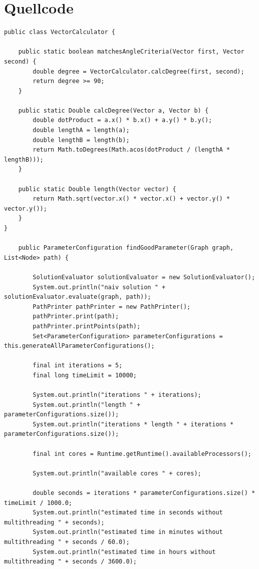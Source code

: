 \section{Quellcode}\label{sec:quellcode}
\begin{lstlisting}[label={lst:source}]
public class VectorCalculator {

    public static boolean matchesAngleCriteria(Vector first, Vector second) {
        double degree = VectorCalculator.calcDegree(first, second);
        return degree >= 90;
    }

    public static Double calcDegree(Vector a, Vector b) {
        double dotProduct = a.x() * b.x() + a.y() * b.y();
        double lengthA = length(a);
        double lengthB = length(b);
        return Math.toDegrees(Math.acos(dotProduct / (lengthA * lengthB)));
    }

    public static Double length(Vector vector) {
        return Math.sqrt(vector.x() * vector.x() + vector.y() * vector.y());
    }
}

    public ParameterConfiguration findGoodParameter(Graph graph, List<Node> path) {

        SolutionEvaluator solutionEvaluator = new SolutionEvaluator();
        System.out.println("naiv solution " + solutionEvaluator.evaluate(graph, path));
        PathPrinter pathPrinter = new PathPrinter();
        pathPrinter.print(path);
        pathPrinter.printPoints(path);
        Set<ParameterConfiguration> parameterConfigurations = this.generateAllParameterConfigurations();

        final int iterations = 5;
        final long timeLimit = 10000;

        System.out.println("iterations " + iterations);
        System.out.println("length " + parameterConfigurations.size());
        System.out.println("iterations * length " + iterations * parameterConfigurations.size());

        final int cores = Runtime.getRuntime().availableProcessors();

        System.out.println("available cores " + cores);

        double seconds = iterations * parameterConfigurations.size() * timeLimit / 1000.0;
        System.out.println("estimated time in seconds without multithreading " + seconds);
        System.out.println("estimated time in minutes without multithreading " + seconds / 60.0);
        System.out.println("estimated time in hours without multithreading " + seconds / 3600.0);


\end{lstlisting}
